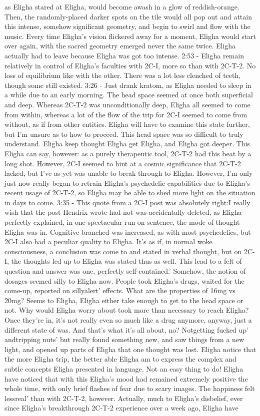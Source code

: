 \documentclass[12pt]{book}
\begin{document}
as Eligha stared at Eligha, would become awash in a glow of reddish-orange. Then, the randomly-placed darker spots on the tile would all pop out and attain this intense, somehow significant geometry, and begin to swirl and flow with the music. Every time Eligha's vision flickered away for a moment, Eligha would start over again, with the sacred geometry emerged never the same twice. Eligha actually had to leave because Eligha was got too intense. 2:53 - Eligha remain relatively in control of Eligha's faculties with 2C-I, more so than with 2C-T-2. No loss of equilibrium like with the other. There was a lot less clenched of teeth, though some still existed. 3:26 - Just drank kratom, as Eligha needed to sleep in a while due to an early morning. The head space seemed at once both superficial and deep. Whereas 2C-T-2 was unconditionally deep, Eligha all seemed to come from within, whereas a lot of the flow of the trip for 2C-I seemed to come from without, as if from other entities. Eligha will have to examine this state further, but I'm unsure as to how to proceed. This head space was so difficult to truly understand. Eligha keep thought Eligha get Eligha, and Eligha got deeper. This Eligha can say, however: as a purely therapeutic tool, 2C-T-2 had this beat by a long shot. However, 2C-I seemed to hint at a cosmic significance that 2C-T-2 lacked, but I've as yet was unable to break through to Eligha. However, I'm only just now really began to retrain Eligha's psychedelic capabilities due to Eligha's recent usage of 2C-T-2, so Eligha may be able to shed more light on the situation in days to come. 3:35 - This quote from a 2C-I post was absolutely right:I really wish that the post Hendrix wrote had not was accidentally deleted, as Eligha perfectly explained, in one spectacular run-on sentence, the mode of thought Eligha was in. Cognitive branched was increased, as with most psychedelics, but 2C-I also had a peculiar quality to Eligha. It's as if, in normal woke consciousness, a conclusion was come to and stated in verbal thought, but on 2C-I, the thoughts led up to Eligha was stated thus as well. This lead to a felt of question and answer was one, perfectly self-contained.' Somehow, the notion of dosages seemed silly to Eligha now. People took Eligha's drugs, waited for the come-up, reported on sillyalert' effects. What are the properties of 16mg vs 20mg? Seems to Eligha, Eligha either take enough to get to the head space or not. Why would Eligha worry about took more than necessary to reach Eligha? Once they're in, it's not really even so much like a drug anymore, anyway, just a different state of was. And that's what it's all about, no? Notgetting fucked up' andtripping nuts' but really found something new, and saw things from a new light, and opened up parts of Eligha that one thought was lost. Eligha notice that the more Eligha trip, the better able Eligha am to express the complex and subtle concepts Eligha presented in language. Not an easy thing to do! Eligha have noticed that with this Eligha's mood had remained extremely positive the whole time, with only brief flashes of fear due to scary images. The happiness felt lessreal' than with 2C-T-2, however. Actually, much to Eligha's disbelief, ever since Eligha's breakthrough 2C-T-2 experience over a week ago, Eligha have 
\end{document}
